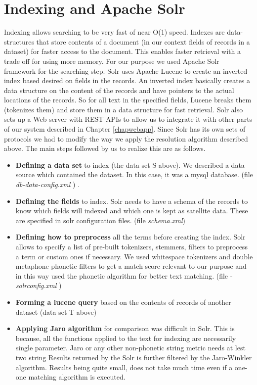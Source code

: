 \section{Indexing and Apache Solr}
        Indexing allows searching to be very fast of near O(1) speed. Indexes are data-structures that store contents of a document (in our context fields of records in a dataset) for faster access to the document. This enables faster retrieval with a trade off for using more memory. For our purpose we used Apache Solr framework \cite{solr}for the searching step. Solr uses Apache Lucene \cite{lucene} to create an inverted index based desired on fields in the records. An inverted index basically creates a data structure on the content of the records and have pointers to the actual locations of the records. So for all text in the specified fields, Lucene breaks them (tokenizes them) and store them in a data structure for fast retrieval.  Solr also sets up a  Web server with REST APIs to allow us to integrate it with other parts of our system described in Chapter \ref{chapwebapp}. 
        Since Solr has its own sets of protocols we had to modify the way we apply the resolution algorithm described above. The main steps followed by us to realize this are as follows.\cite{solrdocs} 
\begin{itemize}

        \item \textbf{ Defining a data set } to index  (the data set S above). We described a data source which contained the dataset. In this case, it was a mysql database. (file \emph{ db-data-config.xml }) .
        \item \textbf{ Defining the fields } to index. Solr needs to have a schema of the records to know which fields will indexed and which one is kept as satellite data. These are specified in solr configuration files. (file \emph{schema.xml})
        \item \textbf{ Defining how to preprocess } all the terms before creating the index. Solr allows to specify a list of pre-built tokenizers, stemmers, filters to preprocess a term or custom ones if necessary. We used whitespace tokenizers and double metaphone phonetic filters to get a match score relevant to our purpose and in this way used the phonetic algorithm for better text matching. (file - \emph{ solrconfig.xml })
        \item \textbf{ Forming a lucene query } based on the contents of records of another dataset (data set T above)
        \item \textbf{ Applying Jaro algorithm } for comparison was difficult in Solr. This is because, all the functions applied to the text for indexing are necessarily single parameter. Jaro or any other non-phonetic string metric needs at lest two string Results returned by the Solr is further filtered by the Jaro-Winkler algorithm. Results being quite small, does not take much time even if a one-one matching algorithm is executed. 

\end{itemize}
